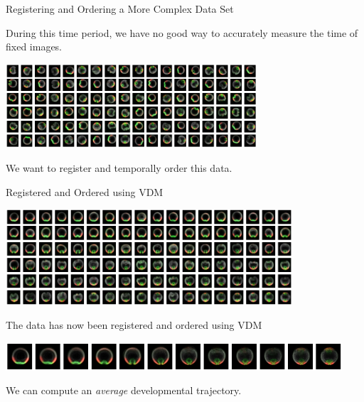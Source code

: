 \documentclass[10pt,aspectratio=169]{beamer}
\begin{document}
\begin{frame}{Registering and Ordering a More Complex Data Set}

During this time period, we have no good way to accurately measure the time of fixed images.

\includegraphics[width=0.7\textwidth]{raw_data2}

We want to register and temporally order this data.

\end{frame}

\begin{frame}{Registered and Ordered using VDM}

\centering

\includegraphics[width=0.8\textwidth]{VDM_ordered}

The data has now been registered and ordered using VDM

\vspace{0.1in}

\includegraphics[width=\textwidth]{average_trajectory}

We can compute an {\em average} developmental trajectory.
\end{frame}
\end{document}

